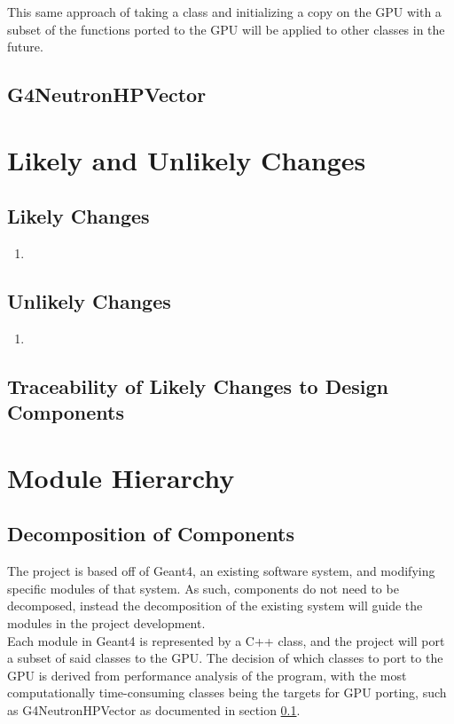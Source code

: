 \documentclass[12pt]{article}
\begin{document}
This same approach of taking a class and initializing a copy on the GPU with a subset of the functions ported to the GPU will be applied to other classes in the future.

\subsection{G4NeutronHPVector}\label{subsec_G4NeutronHPVector} %

\section{Likely and Unlikely Changes}

\subsection{Likely Changes} %
\begin{enumerate}
\item
\end{enumerate}

\subsection{Unlikely Changes} %
\begin{enumerate}
\item
\end{enumerate}

\subsection{Traceability of Likely Changes to Design Components}

\section{Module Hierarchy}%
\subsection{Decomposition of Components}
The project is based off of Geant4, an existing software system, and modifying specific modules of that system. As such, components do not need to be decomposed, instead the decomposition of the existing system will guide the modules in the project development.\\

Each module in Geant4 is represented by a C++ class, and the project will port a subset of said classes to the GPU. The decision of which classes to port to the GPU is derived from performance analysis of the program, with the most computationally time-consuming classes being the targets for GPU porting, such as G4NeutronHPVector as documented in section \ref{subsec_G4NeutronHPVector}.
\end{document}
